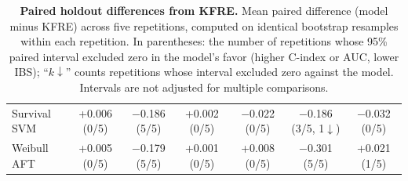 \begin{table}[htbp]
{\begin{tabular}{@{}lcccccc@{}}
Survival SVM & +0.006 (0/5) & $-$0.186 (5/5) & +0.002 (0/5) & $-$0.022 (0/5) & $-$0.186 (3/5, 1$\downarrow$) & $-$0.032 (0/5) \\
Weibull AFT & +0.005 (0/5) & $-$0.179 (5/5) & +0.001 (0/5) & +0.008 (0/5) & $-$0.301 (5/5) & +0.021 (1/5) \\
\bottomrule
\end{tabular}%
}
\caption{{\bf Paired holdout differences from KFRE.} Mean paired difference (model minus KFRE) across five repetitions, computed on identical bootstrap resamples within each repetition. In parentheses: the number of repetitions whose 95\% paired interval excluded zero in the model's favor (higher C-index or AUC, lower IBS); ``$k\downarrow$'' counts repetitions whose interval excluded zero against the model. Intervals are not adjusted for multiple comparisons.}
\label{tab:paired}
\end{table}


